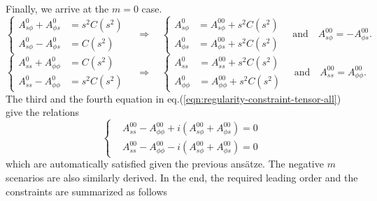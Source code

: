 Finally, we arrive at the $m=0$ case.
\[
\left\{\begin{aligned}
    A_{s\phi}^0 + A_{\phi s}^0 &= s^2 C(s^2) \\ 
    A_{s\phi}^0 - A_{\phi s}^0 &= C(s^2)
\end{aligned}\right. \quad \Longrightarrow\quad 
\left\{\begin{aligned}
    A_{s\phi}^0 &= A_{s\phi}^{00} + s^2 C(s^2) \\ 
    A_{\phi s}^0 &= A_{\phi s}^{00} + s^2 C(s^2) 
\end{aligned}\right. \quad \mathrm{and} \quad A_{s\phi}^{00} = -A_{\phi s}^{00}.
\]
\[
\left\{\begin{aligned}
    A_{ss}^0 + A_{\phi \phi}^0 &= C(s^2) \\ 
    A_{ss}^0 - A_{\phi \phi}^0 &= s^2 C(s^2)
\end{aligned}\right. \quad \Longrightarrow\quad 
\left\{\begin{aligned}
    A_{ss}^0 &= A_{ss}^{00} + s^2 C(s^2) \\ 
    A_{\phi \phi}^0 &= A_{\phi\phi}^{00} + s^{2} C(s^2) 
\end{aligned}\right. \quad \mathrm{and} \quad A_{ss}^{00} = A_{\phi\phi}^{00}.
\]
The third and the fourth equation in eq.(\ref{eqn:regularity-constraint-tensor-all}) give the relations
\[
\left\{\begin{aligned}
    &A_{ss}^{00} - A_{\phi\phi}^{00} + i \left(A_{s\phi}^{00} + A_{\phi s}^{00}\right) = 0 \\ 
    &A_{ss}^{00} - A_{\phi\phi}^{00} - i \left(A_{s\phi}^{00} + A_{\phi s}^{00}\right) = 0
\end{aligned}\right.
\]
which are automatically satisfied given the previous ansätze. The negative $m$ scenarios are also similarly derived. In the end, the required leading order and the constraints are summarized as follows
